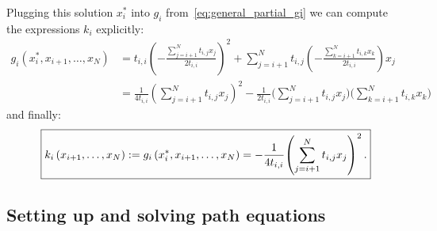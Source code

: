 \documentclass[a4paper,10pt]{article}
\begin{document}
Plugging this solution $x_i^*$ into $g_i$ from~\eqref{eq:general_partial_gi}
we can compute the expressions $k_i$ explicitly:
\begin{equation*}
\begin{split}
  g_i(x_i^*, x_{i+1}, \ldots, x_N)
  & =
  t_{i,i} {\left(
    - \frac{\sum_{j=i+1}^{N} t_{i,j} x_j}{2 t_{i,i}}
  \right)}^2
  + \sum_{j=i+1}^{N} t_{i,j} \left(
                                   - \frac{\sum_{k=i+1}^{N} t_{i,k} x_k}{2 t_{i,i}}
                             \right) x_j \\
  & =
  \frac{1}{4 t_{i,i}}
  {\left( \sum_{j=i+1}^{N} t_{i,j} x_j \right)}^2
  - \frac{1}{2 t_{i,i}} \Biggl(\sum_{j=i+1}^{N} t_{i,j} x_j\Biggr) \Biggl(\sum_{k=i+1}^{N} t_{i,k} x_k\Biggr)
\end{split}
\end{equation*}
and finally:
\begin{equation}\label{eq:general_ki}
\boxed{
  k_i\left(x_{i+1}, \ldots, x_N\right)
  :=
  g_i\left(x_i^*, x_{i+1}, \ldots, x_N\right) = - \frac{1}{4 t_{i,i}} {\left( \sum_{j=i+1}^{N} t_{i,j} x_j \right)}^2 \,.
}
\end{equation}


\subsection{Setting up and solving path equations}
\end{document}
